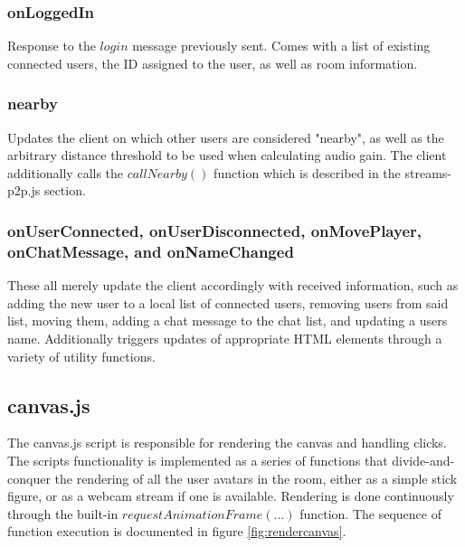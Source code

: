 \subsubsection{onLoggedIn}

Response to the $login$ message previously sent. Comes with a list of existing connected users, the ID assigned to the user, as well as room information.

\subsubsection{nearby}

Updates the client on which other users are considered "nearby", as well as the arbitrary distance threshold to be used when calculating audio gain. The client additionally calls the $callNearby()$ function which is described in the streams-p2p.js section.

\subsubsection{onUserConnected, onUserDisconnected, onMovePlayer, onChatMessage, and onNameChanged}

These all merely update the client accordingly with received information, such as adding the new user to a local list of connected users, removing users from said list, moving them, adding a chat message to the chat list, and updating a users name. Additionally triggers updates of appropriate HTML elements through a variety of utility functions.

\subsection{canvas.js}

The canvas.js script is responsible for rendering the canvas and handling clicks. The scripts functionality is implemented as a series of functions that divide-and-conquer the rendering of all the user avatars in the room, either as a simple stick figure, or as a webcam stream if one is available. Rendering is done continuously through the built-in $requestAnimationFrame(...)$ function. The sequence of function execution is documented in figure \ref{fig:rendercanvas}.

